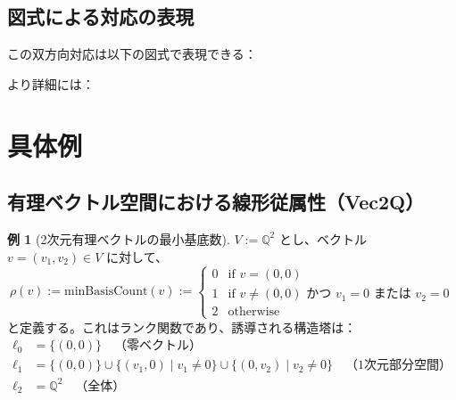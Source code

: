 \documentclass[a4paper,11pt]{ltjsarticle}
\theoremstyle{definition}
\newtheorem{example}[definition]{例}
\begin{document}
\subsection{図式による対応の表現}

この双方向対応は以下の図式で表現できる：

\begin{center}
\end{center}

より詳細には：

\begin{center}
\end{center}

\section{具体例}

\subsection{有理ベクトル空間における線形従属性（Vec2Q）}

\begin{example}[2次元有理ベクトルの最小基底数]\label{ex:vec2q}
$V := \mathbb{Q}^2$ とし、ベクトル $v = (v_1, v_2) \in V$ に対して、
\[
\rho(v) := \mathrm{minBasisCount}(v) := \begin{cases}
0 & \text{if } v = (0, 0) \\
1 & \text{if } v \neq (0,0) \text{ かつ } v_1 = 0 \text{ または } v_2 = 0 \\
2 & \text{otherwise}
\end{cases}
\]
と定義する。これはランク関数であり、誘導される構造塔は：
\begin{align*}
\ell_0 &= \{(0, 0)\} \quad\text{（零ベクトル）} \\
\ell_1 &= \{(0, 0)\} \cup \{(v_1, 0) \mid v_1 \neq 0\} \cup \{(0, v_2) \mid v_2 \neq 0\} \quad\text{（1次元部分空間）} \\
\ell_2 &= \mathbb{Q}^2 \quad\text{（全体）}
\end{align*}
\end{example}
\end{document}
